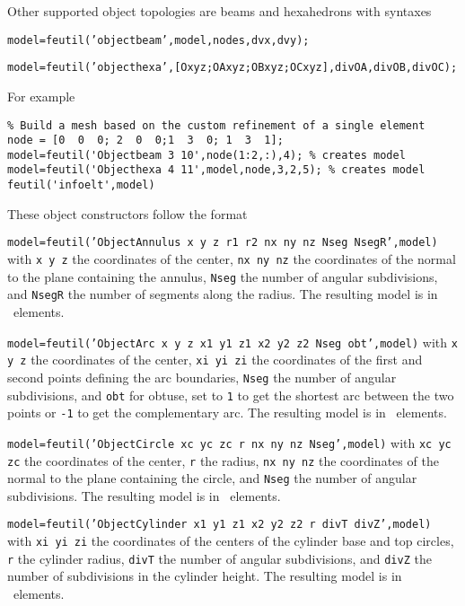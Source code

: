 Other supported object topologies are beams and hexahedrons with syntaxes

{\tt model=feutil('objectbeam',model,nodes,dvx,dvy);}

{\tt model=feutil('objecthexa',[Oxyz;OAxyz;OBxyz;OCxyz],divOA,divOB,divOC);}

For example
\begin{verbatim}
% Build a mesh based on the custom refinement of a single element
node = [0  0  0; 2  0  0;1  3  0; 1  3  1];
model=feutil('Objectbeam 3 10',node(1:2,:),4); % creates model 
model=feutil('Objecthexa 4 11',model,node,3,2,5); % creates model 
feutil('infoelt',model)
\end{verbatim}%



These object constructors follow the format

{\tt model=feutil('ObjectAnnulus x y z r1 r2 nx ny nz Nseg NsegR',model)}
with {\tt x y z} the coordinates of the center, {\tt nx ny nz} the coordinates of the normal to the plane containing the annulus, {\tt Nseg} the number of angular subdivisions, and {\tt NsegR} the number of segments along the radius. The resulting model is in \quada\ elements.

{\tt model=feutil('ObjectArc x y z x1 y1 z1 x2 y2 z2 Nseg obt',model)}
with {\tt x y z} the coordinates of the center, {\tt xi yi zi} the coordinates of the first and second points defining the arc boundaries, {\tt Nseg} the number of angular subdivisions, and {\tt obt} for obtuse, set to {\tt 1} to get the shortest arc between the two points or {\tt -1} to get the complementary arc. The resulting model is in \beam\ elements.

{\tt model=feutil('ObjectCircle xc yc zc r nx ny nz Nseg',model)}
with {\tt xc yc zc} the coordinates of the center, {\tt r} the radius, {\tt nx ny nz} the coordinates of the normal to the plane containing the circle, and {\tt Nseg} the number of angular subdivisions. The resulting model is in \beam\ elements.

{\tt model=feutil('ObjectCylinder x1 y1 z1 x2 y2 z2 r divT divZ',model)}
with {\tt xi yi zi} the coordinates of the centers of the cylinder base and top circles, {\tt r} the cylinder radius, {\tt divT} the number of angular subdivisions, and {\tt divZ} the number of subdivisions in the cylinder height. The resulting model is in \quada\ elements.

